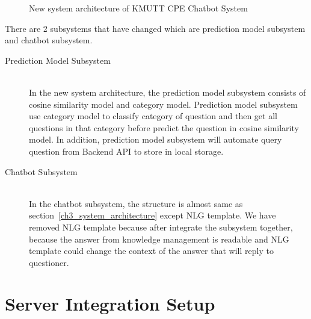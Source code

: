 \documentclass[12pt,oneside,openright,a4paper]{cpe-english-project}
\begin{document}
\begin{figure}[!h]\centering
{}
\caption{New system architecture of KMUTT CPE Chatbot System}
\label{fig:new_software_architecture}
\end{figure}

There are 2 subsystems that have changed which are prediction model subsystem and chatbot subsystem.

\begin{description}
	\item [Prediction Model Subsystem]\hfill \\
	In the new system architecture, the prediction model subsystem consists of cosine similarity model and
	category model. Prediction model subsystem use category model to classify category of question and then
	get all questions in that category before predict the question in cosine similarity model.
	In addition, prediction model subsystem will automate query question from Backend API to store in local storage.
	\item [Chatbot Subsystem]
	\hfill \\
	In the chatbot subsystem, the structure is almost same as section~\ref*{ch3_system_architecture} except NLG template.
	We have removed NLG template because after integrate the subsystem together,
	because the answer from knowledge management is readable and NLG template could change 
	the context of the answer that will reply to questioner.
\end{description}

\section{Server Integration Setup}
\end{document}
